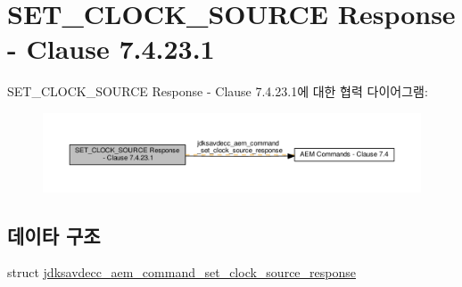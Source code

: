 \hypertarget{group__command__set__clock__source__response}{}\section{S\+E\+T\+\_\+\+C\+L\+O\+C\+K\+\_\+\+S\+O\+U\+R\+CE Response -\/ Clause 7.4.23.1}
\label{group__command__set__clock__source__response}
S\+E\+T\+\_\+\+C\+L\+O\+C\+K\+\_\+\+S\+O\+U\+R\+CE Response -\/ Clause 7.4.23.1에 대한 협력 다이어그램\+:
\nopagebreak
\begin{figure}[H]
\begin{center}
\leavevmode
\includegraphics[width=350pt]{group__command__set__clock__source__response}
\end{center}
\end{figure}
\subsection*{데이타 구조}
\begin{DoxyCompactItemize}
\item 
struct \hyperlink{structjdksavdecc__aem__command__set__clock__source__response}{jdksavdecc\+\_\+aem\+\_\+command\+\_\+set\+\_\+clock\+\_\+source\+\_\+response}
\end{DoxyCompactItemize}
